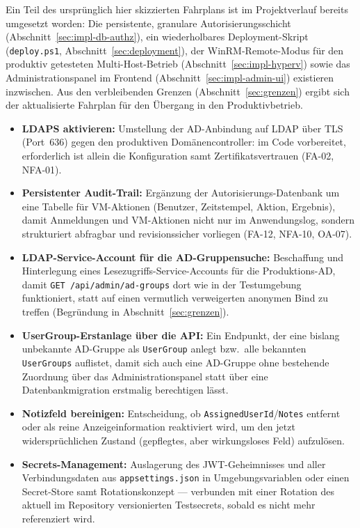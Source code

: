 \documentclass[12pt,a4paper]{article}
\begin{document}
Ein Teil des ursprünglich hier skizzierten Fahrplans ist im Projektverlauf bereits umgesetzt worden: Die persistente, granulare Autorisierungsschicht (Abschnitt~\ref{sec:impl-db-authz}), ein wiederholbares Deployment-Skript (\texttt{deploy.ps1}, Abschnitt~\ref{sec:deployment}), der WinRM-Remote-Modus für den produktiv getesteten Multi-Host-Betrieb (Abschnitt~\ref{sec:impl-hyperv}) sowie das Administrationspanel im Frontend (Abschnitt~\ref{sec:impl-admin-ui}) existieren inzwischen. Aus den verbleibenden Grenzen (Abschnitt~\ref{sec:grenzen}) ergibt sich der aktualisierte Fahrplan für den Übergang in den Produktivbetrieb.

\begin{itemize}
  \item \textbf{LDAPS aktivieren:} Umstellung der AD-Anbindung auf LDAP über TLS (Port~636) gegen den produktiven Domänencontroller: im Code vorbereitet, erforderlich ist allein die Konfiguration samt Zertifikatsvertrauen (FA-02, NFA-01).
  \item \textbf{Persistenter Audit-Trail:} Ergänzung der Autorisierungs-Datenbank um eine Tabelle für VM-Aktionen (Benutzer, Zeitstempel, Aktion, Ergebnis), damit Anmeldungen und VM-Aktionen nicht nur im Anwendungslog, sondern strukturiert abfragbar und revisionssicher vorliegen (FA-12, NFA-10, OA-07).
  \item \textbf{LDAP-Service-Account für die AD-Gruppensuche:} Beschaffung und Hinterlegung eines Lesezugriffs-Service-Accounts für die Produktions-AD, damit \texttt{GET~/api/admin/ad-groups} dort wie in der Testumgebung funktioniert, statt auf einen vermutlich verweigerten anonymen Bind zu treffen (Begründung in Abschnitt~\ref{sec:grenzen}).
  \item \textbf{UserGroup-Erstanlage über die API:} Ein Endpunkt, der eine bislang unbekannte AD-Gruppe als \texttt{UserGroup} anlegt bzw.\ alle bekannten \texttt{UserGroups} auflistet, damit sich auch eine AD-Gruppe ohne bestehende Zuordnung über das Administrationspanel statt über eine Datenbankmigration erstmalig berechtigen lässt.
  \item \textbf{Notizfeld bereinigen:} Entscheidung, ob \texttt{AssignedUserId}/\texttt{Notes} entfernt oder als reine Anzeigeinformation reaktiviert wird, um den jetzt widersprüchlichen Zustand (gepflegtes, aber wirkungsloses Feld) aufzulösen.
  \item \textbf{Secrets-Management:} Auslagerung des JWT-Geheimnisses und aller Verbindungsdaten aus \texttt{appsettings.json} in Umgebungsvariablen oder einen Secret-Store samt Rotationskonzept — verbunden mit einer Rotation des aktuell im Repository versionierten Testsecrets, sobald es nicht mehr referenziert wird.

\end{itemize}
\end{document}
